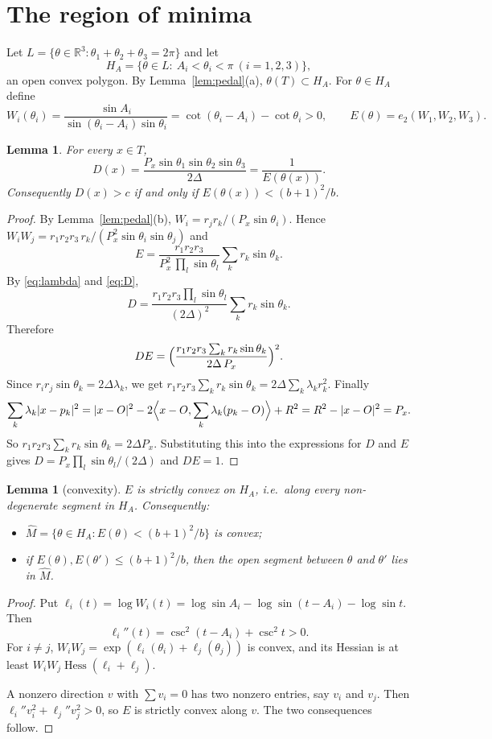 \documentclass[11pt]{amsart}
\newtheorem{lemma}[theorem]{Lemma}
\theoremstyle{remark}
\newcommand{\R}{\mathbb{R}}
\DeclareMathOperator{\Hess}{Hess}
\begin{document}
\section{The region of minima}

Let $L=\{\theta\in\R^3:\theta_1+\theta_2+\theta_3=2\pi\}$ and let
\[
  H_A=\{\theta\in L:\ A_i<\theta_i<\pi\ (i=1,2,3)\},
\]
an open convex polygon. By Lemma~\ref{lem:pedal}(a), $\theta(T)\subset H_A$. For $\theta\in H_A$ define
\[
  W_i(\theta_i)=\frac{\sin A_i}{\sin(\theta_i-A_i)\sin\theta_i}=\cot(\theta_i-A_i)-\cot\theta_i>0,
  \qquad E(\theta)=e_2(W_1,W_2,W_3).
\]

\begin{lemma}\label{lem:D}
For every $x\in T$,
\[
  D(x)=\frac{P_x\sin\theta_1\sin\theta_2\sin\theta_3}{2\Delta}=\frac{1}{E(\theta(x))}.
\]
Consequently $D(x)>c$ if and only if $E(\theta(x))<(b+1)^2/b$.
\end{lemma}

\begin{proof}
By Lemma~\ref{lem:pedal}(b), $W_i=r_jr_k/(P_x\sin\theta_i)$. Hence $W_iW_j=r_1r_2r_3\,r_k/(P_x^2\sin\theta_i\sin\theta_j)$ and
\[
  E=\frac{r_1r_2r_3}{P_x^2\,\prod_l\sin\theta_l}\sum_kr_k\sin\theta_k .
\]
By \eqref{eq:lambda} and \eqref{eq:D},
\[
  D=\frac{r_1r_2r_3\prod_l\sin\theta_l}{(2\Delta)^2}\sum_kr_k\sin\theta_k .
\]
Therefore
\[
  DE=\Bigl(\frac{r_1r_2r_3\sum_kr_k\sin\theta_k}{2\Delta\,P_x}\Bigr)^2 .
\]
Since $r_ir_j\sin\theta_k=2\Delta\lambda_k$, we get $r_1r_2r_3\sum_kr_k\sin\theta_k=2\Delta\sum_k\lambda_kr_k^2$. Finally
\[
  \sum_k\lambda_k|x-p_k|^2=|x-O|^2-2\Bigl\langle x-O,\sum_k\lambda_k(p_k-O)\Bigr\rangle+R^2=R^2-|x-O|^2=P_x .
\]
So $r_1r_2r_3\sum_kr_k\sin\theta_k=2\Delta P_x$. Substituting this into the expressions for $D$ and $E$ gives
$D=P_x\prod_l\sin\theta_l/(2\Delta)$ and $DE=1$.
\end{proof}

\begin{lemma}[convexity]\label{lem:convex}
$E$ is strictly convex on $H_A$, i.e.\ along every non-degenerate segment in $H_A$. Consequently:
\begin{itemize}
\item $\widehat M=\{\theta\in H_A:E(\theta)<(b+1)^2/b\}$ is convex;
\item if $E(\theta),E(\theta')\le(b+1)^2/b$, then the open segment between $\theta$ and $\theta'$ lies in $\widehat M$.
\end{itemize}
\end{lemma}

\begin{proof}
Put $\ell_i(t)=\log W_i(t)=\log\sin A_i-\log\sin(t-A_i)-\log\sin t$. Then
\[
  \ell_i''(t)=\csc^2(t-A_i)+\csc^2t>0 .
\]
For $i\ne j$, $W_iW_j=\exp(\ell_i(\theta_i)+\ell_j(\theta_j))$ is convex, and its Hessian is at least
$W_iW_j\Hess(\ell_i+\ell_j)$.

A nonzero direction $v$ with $\sum v_i=0$ has two nonzero entries, say $v_i$ and $v_j$. Then
$\ell_i''v_i^2+\ell_j''v_j^2>0$, so $E$ is strictly convex along $v$. The two consequences follow.
\end{proof}
\end{document}
